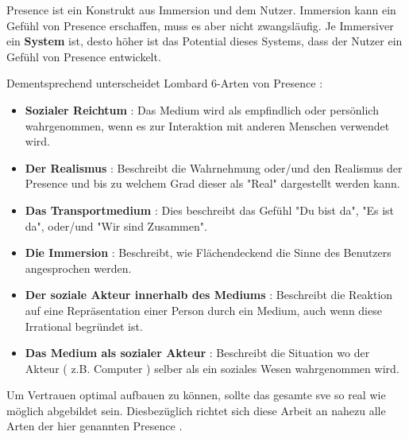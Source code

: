 \documentclass[a4paper,11pt]{article}%
\renewcommand{\\}{\vspace*{0.5\baselineskip} \newline}
\begin{document}
\dq Presence\dq{} ist ein Konstrukt aus Immersion und dem Nutzer. Immersion kann ein Gefühl von \dq Presence\dq{} erschaffen, muss es aber nicht zwangsläufig. Je Immersiver ein \textbf{System} ist, desto höher ist das Potential dieses Systems, dass der Nutzer ein Gefühl von \dq Presence\dq{} entwickelt.
			
Dementsprechend unterscheidet Lombard 6-Arten von \dq Presence\dq{} :
	\begin{itemize}
		\item \textbf{Sozialer Reichtum} : Das Medium wird als empfindlich oder persönlich wahrgenommen, wenn es zur Interaktion mit anderen Menschen verwendet wird.
		\item \textbf{Der Realismus} : Beschreibt die Wahrnehmung oder/und den Realismus der \dq Presence\dq{} und bis zu welchem Grad dieser als "Real" dargestellt werden kann.
		\item \textbf{Das Transportmedium} : Dies beschreibt das Gefühl "Du bist da", "Es ist da", oder/und "Wir sind Zusammen".
		\item \textbf{Die Immersion} : Beschreibt, wie Flächendeckend die Sinne des Benutzers angesprochen werden.
		\item \textbf{Der soziale Akteur innerhalb des Mediums} : Beschreibt die Reaktion auf eine Repräsentation einer Person durch ein Medium, auch wenn diese Irrational begründet ist.
		\item \textbf{Das Medium als sozialer Akteur} : Beschreibt die Situation wo der Akteur ( z.B. Computer ) selber als ein soziales Wesen wahrgenommen wird.					
				\citep{lombard1997heart}
			\end{itemize}
			
Um Vertrauen optimal aufbauen zu können, sollte das gesamte \ac{sve} so real wie möglich abgebildet sein. Diesbezüglich richtet sich diese Arbeit an nahezu alle Arten der hier genannten \dq Presence \dq{}.


\end{document}
